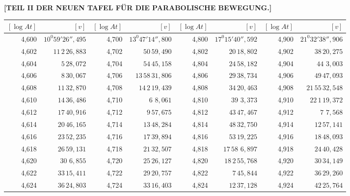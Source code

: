 \clearpage
{}
\begingroup
\centering
\fontsize{9}{9}\selectfont
\setlength{\tabcolsep}{1.25pt}
\renewcommand{\arraystretch}{.9}
\setlength{\parskip}{0pt}
\textbf{[TEIL II DER NEUEN TAFEL FÜR DIE PARABOLISCHE BEWEGUNG.]}
\par\vspace{7pt}
\begin{tabular}{|r|r||r|r||r|r||r|r|}
\hline
\([\log At]\) & \([v]\) & \([\log At]\) & \([v]\) & \([\log At]\) & \([v]\) & \([\log At]\) & \([v]\) \\
\hline
4,600 & \(10^{0}59'26'',\!495\) & 4,700 & \(13^{0}47'14'',\!800\) & 4,800 & \(17^{0}15'40'',\!592\) & 4,900 & \(21^{0}32'38'',\!906\) \\[1pt]
4,602 & \(11\,2\,26,\!883\) & 4,702 & \(50\,59,\!490\) & 4,802 & \(20\,18,\!802\) & 4,902 & \(38\,20,\!275\) \\
4,604 & \(5\,28,\!072\) & 4,704 & \(54\,45,\!158\) & 4,804 & \(24\,58,\!182\) & 4,904 & \(44\,\,3,\!003\) \\
4,606 & \(8\,30,\!067\) & 4,706 & \(13\,58\,31,\!806\) & 4,806 & \(29\,38,\!734\) & 4,906 & \(49\,47,\!093\) \\
4,608 & \(11\,32,\!870\) & 4,708 & \(14\,2\,19,\!439\) & 4,808 & \(34\,20,\!463\) & 4,908 & \(21\,55\,32,\!548\) \\[1pt]
4,610 & \(14\,36,\!486\) & 4,710 & \(6\,\,8,\!061\) & 4,810 & \(39\,\,3,\!373\) & 4,910 & \(22\,1\,19,\!372\) \\[1pt]
4,612 & \(17\,40,\!916\) & 4,712 & \(9\,57,\!675\) & 4,812 & \(43\,47,\!467\) & 4,912 & \(7\,\,7,\!568\) \\
4,614 & \(20\,46,\!165\) & 4,714 & \(13\,48,\!284\) & 4,814 & \(48\,32,\!750\) & 4,914 & \(12\,57,\!141\) \\
4,616 & \(23\,52,\!235\) & 4,716 & \(17\,39,\!894\) & 4,816 & \(53\,19,\!225\) & 4,916 & \(18\,48,\!093\) \\
4,618 & \(26\,59,\!131\) & 4,718 & \(21\,32,\!507\) & 4,818 & \(17\,58\,\,6,\!897\) & 4,918 & \(24\,40,\!428\) \\[1pt]
4,620 & \(30\,\,6,\!855\) & 4,720 & \(25\,26,\!127\) & 4,820 & \(18\,2\,55,\!768\) & 4,920 & \(30\,34,\!149\) \\[1pt]
4,622 & \(33\,15,\!411\) & 4,722 & \(29\,20,\!757\) & 4,822 & \(7\,45,\!844\) & 4,922 & \(36\,29,\!260\) \\
4,624 & \(36\,24,\!803\) & 4,724 & \(33\,16,\!403\) & 4,824 & \(12\,37,\!128\) & 4,924 & \(42\,25,\!764\) \\

\end{tabular}
